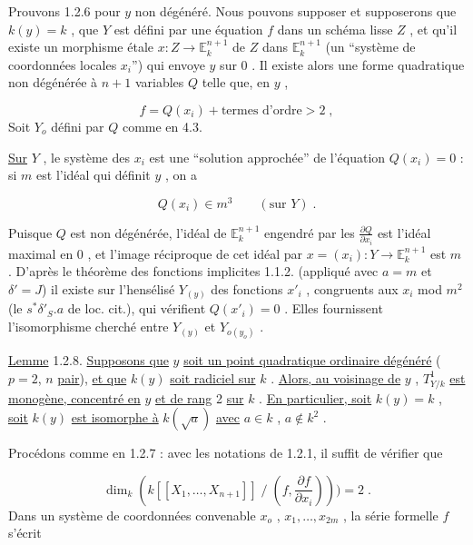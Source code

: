 Prouvons 1.2.6 pour $y$ non dégénéré. Nous pouvons supposer et supposerons que $k(y) = k$ , que $Y$ est défini par une équation $f$ dans un schéma lisse $Z$ , et qu'il existe un morphisme étale $x : Z \longrightarrow \mathbb{E}^{n+1}_k$ de $Z$ dans $\mathbb{E}^{n+1}_k$ (un ``système de coordonnées locales $x_i$'') qui envoye $y$ sur $0$ . Il existe alors une forme quadratique non dégénérée à $n+1$ variables $Q$ telle que, en $y$ ,

\begin{equation*}
f = Q(x_i) + \text{termes d'ordre} > 2 \;,
\end{equation*}
Soit $Y_o$ défini par $Q$ comme en 4.3.

\underline{Sur} $Y$ , le système des $x_i$ est une ``solution approchée'' de l'équation $Q(x_i) = 0$ : si $m$ est l'idéal qui définit $y$ , on a

\begin{equation*}
Q(x_i) \in m^3 \qquad (\text{sur } Y) \;.
\end{equation*}


Puisque $Q$ est non dégénérée, l'idéal de $\mathbb{E}^{n+1}_k$ engendré par les $\frac{\partial Q}{\partial x_i}$ est l'idéal maximal en $0$ , et l'image réciproque de cet idéal par $x = (x_i) : Y \longrightarrow \mathbb{E}^{n+1}_k$ est $m$ . D'après le théorème des fonctions implicites 1.1.2. (appliqué avec $a = m$ et $\delta' = J$) il existe sur l'hensélisé $Y_{(y)}$ des fonctions $x'_i$ , congruents aux $x_i$ mod $m^2$ (le $s^*\delta'_S.a$ de loc. cit.), qui vérifient $Q(x'_i) = 0$ . Elles fournissent l'isomorphisme cherché entre $Y_{(y)}$ et $Y_{o(y_o)}$ .

\underline{Lemme} 1.2.8. \underline{Supposons que} $y$ \underline{soit un point quadratique ordinaire dégénéré} ($p = 2$, $n$ \underline{pair}), \underline{et que} $k(y)$ \underline{soit radiciel sur} $k$ . \underline{Alors, au voisinage de} $y$ , $T^1_{Y/k}$ \underline{est monogène, concentré en} $y$ \underline{et de rang} 2 \underline{sur} $k$ . \underline{En particulier, soit} $k(y) = k$ , \underline{soit} $k(y)$ \underline{est isomorphe à} $k(\sqrt{a})$ \underline{avec} $a \in k$ , $a \notin k^2$ .

Procédons comme en 1.2.7 : avec les notations de 1.2.1, il suffit de vérifier que

\begin{equation*}
\dim_k(k[[X_1,\ldots,X_{n+1}]] \;/\; (f,\frac{\partial f}{\partial x_i}))) = 2 \;.
\end{equation*}
Dans un système de coordonnées convenable $x_o$ , $x_1,\ldots,x_{2m}$ , la série formelle $f$ s'écrit

